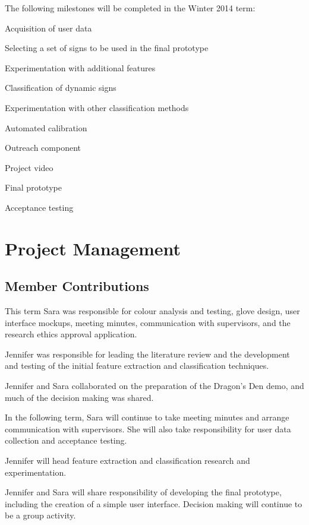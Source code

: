 \documentclass[12pt]{article}
\begin{document}
The following milestones will be completed in the Winter 2014 term:
\begin{enumerate*}
  \item Acquisition of user data
  \item Selecting a set of signs to be used in the final prototype
  \item Experimentation with additional features
  \item Classification of dynamic signs
  \item Experimentation with other classification methods
  \item Automated calibration 
  \item Outreach component
  \item Project video
  \item Final prototype
  \item Acceptance testing
\end{enumerate*}

\newpage
\section{Project Management}
\subsection{Member Contributions}
\label{subsec:member}
This term Sara was responsible for colour analysis and testing, glove design, user interface mockups, meeting minutes, communication with supervisors, and the research ethics approval application. 

Jennifer was responsible for leading the literature review and the development and testing of the initial feature extraction and classification techniques. 

Jennifer and Sara collaborated on the preparation of the Dragon’s Den demo, and much of the decision making was shared.

In the following term, Sara will continue to take meeting minutes and arrange communication with supervisors. She will also take responsibility for user data collection and acceptance testing. 

Jennifer will head feature extraction and classification research and experimentation. 

Jennifer and Sara will share responsibility of developing the final prototype, including the creation of a simple user interface. Decision making will continue to be a group activity. 
\end{document}
